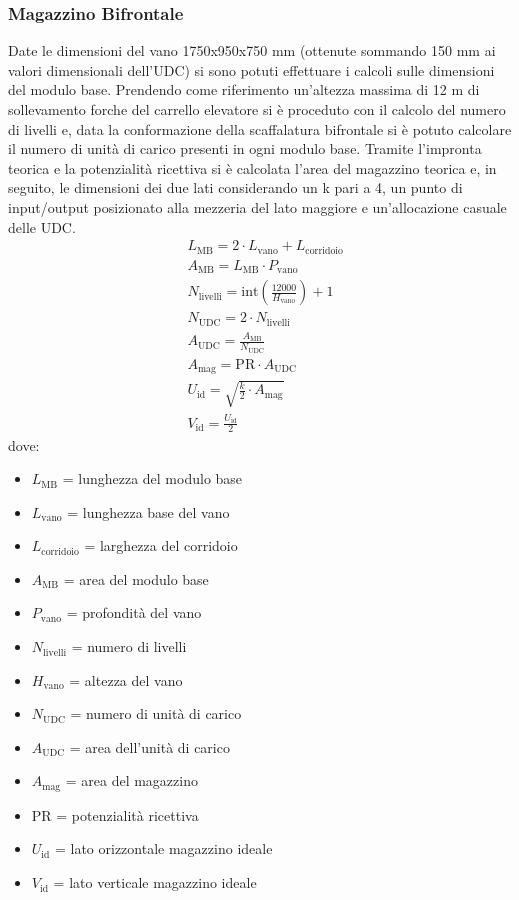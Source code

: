 \documentclass[11pt]{article}
\begin{document}
\subsubsection{Magazzino Bifrontale}
Date le dimensioni del vano 1750x950x750 mm (ottenute sommando 150 mm ai valori dimensionali dell'UDC) si sono potuti effettuare i calcoli sulle dimensioni del modulo base.
Prendendo come riferimento un'altezza massima di 12 m di sollevamento forche del carrello elevatore si è proceduto con il calcolo del numero di livelli e, data la conformazione della scaffalatura bifrontale si è potuto calcolare il numero di unità di carico presenti in ogni modulo base. Tramite l'impronta teorica e la potenzialità ricettiva si è calcolata l'area del magazzino teorica e, in seguito, le dimensioni dei due lati considerando un k pari a 4, un punto di input/output posizionato alla mezzeria del lato maggiore e un'allocazione casuale delle UDC.
\begin{align}
    & L_\text{MB} = 2 \cdot L_\text{vano} + L_\text{corridoio} \\
    & A_\text{MB} = L_\text{MB} \cdot P_\text{vano} \\
    & N_\text{livelli} = \text{int}\left(\frac{12000}{H_\text{vano}}\right) + 1 \\
    & N_\text{UDC} = 2 \cdot N_\text{livelli} \\
    & A_\text{UDC} = \frac{A_\text{MB}}{N_\text{UDC}} \\
    & A_\text{mag} = \text{PR} \cdot A_\text{UDC} \\
    & U_\text{id} = \sqrt{\frac{k}{2} \cdot A_\text{mag}} \\
    & V_\text{id} = \frac{U_\text{id}}{2}
\end{align}
dove:
\begin{itemize}
    \item $L_\text{MB}$ = lunghezza del modulo base
    \item $L_\text{vano}$ = lunghezza base del vano
    \item $L_\text{corridoio}$ = larghezza del corridoio
    \item $A_\text{MB}$ = area del modulo base
    \item $P_\text{vano}$ = profondità del vano
    \item $N_\text{livelli}$ = numero di livelli
    \item $H_\text{vano}$ = altezza del vano
    \item $N_\text{UDC}$ = numero di unità di carico
    \item $A_\text{UDC}$ = area dell'unità di carico
    \item $A_\text{mag}$ = area del magazzino
    \item $\text{PR}$ = potenzialità ricettiva
    \item $U_\text{id}$ = lato orizzontale magazzino ideale
    \item $V_\text{id}$ = lato verticale magazzino ideale
\end{itemize}
\end{document}
